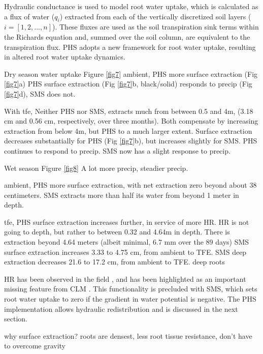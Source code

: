 \documentclass[draft,linenumbers]{agujournal}
\begin{document}
Hydraulic conductance is used to model root water uptake, which is calculated as a flux of water ($q_i$) extracted from each of the vertically discretized soil layers ($i=\left[1,2,...,n\right]$).
These fluxes are used as the soil transpiration sink terms within the Richards equation and, summed over the soil column, are equivalent to the transpiration flux.
PHS adopts a new framework for root water uptake, resulting in altered root water uptake dynamics.

Dry season water uptake Figure \ref{fig7} 
ambient, 
PHS more surface extraction (Fig \ref{fig7}a)
PHS surface extraction (Fig \ref{fig7}b, black/solid) responds to precip (Fig \ref{fig7}d),
SMS does not.

With tfe,
Neither PHS nor SMS, extracts much from between 0.5 and 4m, (3.18 cm and 0.56 cm, respectively, over three months).
Both compensate by increasing extraction from below 4m, but PHS to a much larger extent.
Surface extraction decreases substantially for PHS (Fig \ref{fig7}b),
but increases slightly for SMS.
PHS continues to respond to precip.
SMS now has a slight response to precip.

Wet season Figure \ref{fig8}
A lot more precip, steadier precip.

ambient,
PHS more surface extraction, with net extraction zero beyond about 38 centimeters.
SMS extracts more than half its water from beyond 1 meter in depth.

tfe,
PHS surface extraction increases further, in service of more HR.
HR is not going to depth, but rather to between 0.32 and 4.64m in depth.
There is extraction beyond 4.64 meters (albeit minimal, 6.7 mm over the 89 days)
SMS surface extraction increases 3.33 to 4.75 cm, from ambient to TFE.
SMS deep extraction decreases 21.6 to 17.2 cm, from ambient to TFE.
deep roots \citep{nepstad1994}

HR has been observed in the field \citep{oliveira2005}, and has been highlighted as an important missing feature from CLM \citep{lee2005}.
This functionality is precluded with SMS, which sets root water uptake to zero if the gradient in water potential is negative. 
The PHS implementation allows hydraulic redistribution and is discussed in the next section.

why surface extraction?
roots are densest, less root tissue resistance, don't have to overcome gravity
\end{document}
